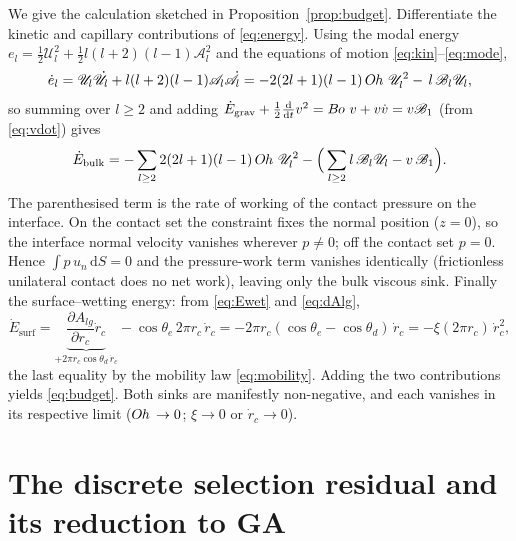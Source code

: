 \documentclass{jfm}
\newcommand{\be}{\begin{equation}}
\newcommand{\ee}{\end{equation}}
\newcommand{\Bo}{B\kern-0.05em o\,}
\newcommand{\Oh}{O\kern-0.05em h\,}
\begin{document}
We give the calculation sketched in Proposition~\ref{prop:budget}. Differentiate the
kinetic and capillary contributions of \eqref{eq:energy}. Using the modal energy
$e_l=\tfrac12\mathscr U_l^2+\tfrac12 l(l+2)(l-1)\mathscr A_l^2$ and the equations of
motion \eqref{eq:kin}--\eqref{eq:mode},
\be
\dot e_l=\mathscr U_l\dot{\mathscr U}_l+l(l+2)(l-1)\mathscr A_l\dot{\mathscr A}_l
=-2(2l+1)(l-1)\,\Oh\,\mathscr U_l^2-\,l\,\mathscr B_l\mathscr U_l,
\ee
so summing over $l\ge2$ and adding $\dot E_{\text{grav}}+\tfrac12\frac{\mathrm d}{\mathrm
dt}v^2=\Bo\,v+v\dot v=v\mathscr B_1$ (from \eqref{eq:vdot}) gives
\be\label{eq:bulkwork}
\dot E_{\text{bulk}}
=-\sum_{l\ge2}2(2l+1)(l-1)\,\Oh\,\mathscr U_l^2
-\Big(\sum_{l\ge2}l\,\mathscr B_l\mathscr U_l-v\,\mathscr B_1\Big).
\ee
The parenthesised term is the rate of working of the contact pressure on the interface.
On the contact set the constraint fixes the normal position ($z=0$), so the interface
normal velocity vanishes wherever $p\neq0$; off the contact set $p=0$. Hence
$\int p\,u_n\,\mathrm dS=0$ and the pressure-work term vanishes identically (frictionless
unilateral contact does no net work), leaving only the bulk viscous sink. Finally the
surface--wetting energy: from \eqref{eq:Ewet} and \eqref{eq:dAlg},
\be
\dot E_{\text{surf}}
=\underbrace{\frac{\partial A_{lg}}{\partial r_c}\dot r_c}_{+2\pi r_c\cos\theta_d\,\dot r_c}
-\cos\theta_e\,2\pi r_c\,\dot r_c
=-2\pi r_c(\cos\theta_e-\cos\theta_d)\,\dot r_c
=-\xi(2\pi r_c)\,\dot r_c^2,
\ee
the last equality by the mobility law \eqref{eq:mobility}. Adding the two contributions
yields \eqref{eq:budget}. Both sinks are manifestly non-negative, and each vanishes in
its respective limit ($\Oh\to0$; $\xi\to0$ or $\dot r_c\to0$).

\section{The discrete selection residual and its reduction to GA}\label{app:discrete}
\end{document}
